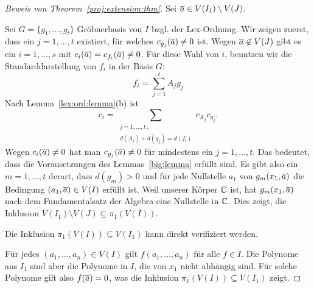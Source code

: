 \documentclass[11pt]{article}
\numberwithin{equation}{section}
\begin{document}
\begin{proof}[Beweis von Theorem~\ref{proj:extension:thm}]	
	Sei $\overline{a} \in V(I_1) \setminus V(J)$. 
	
	Sei $G = \{g_1,\ldots, g_t\}$ Gröbnerbasis von $I$ bzgl. der Lex-Ordnung. Wir zeigen zuerst, dass ein $j =1,\ldots,t$ existiert, für welches $c_{g_j}(\overline{a}) \ne 0$ ist. Wegen $\overline{a} \not\in V(J)$ gibt es ein $i =1,\ldots,s$ mit $c_i (\overline{a}) = c_{f_i}(\overline{a}) \ne 0$. Für diese Wahl von $i$, benutzen wir die Standarddarstellung von $f_i$ in der Basis $G$: 
	\[
		f_i = \sum_{j=1}^t A_j g_j
	\]
	Nach Lemma~\ref{lex:ord:lemma}(b) ist 
	\[
		c_i = \sum_{\substack{j=1,\ldots, t \, :  \\ d(A_j)+ d(g_j) = d(f_i)}} c_{A_j} c_{g_j}. 
	\]
	Wegen $c_i(\overline{a}) \ne 0$ hat man $c_{g_j}(\overline{a}) \ne 0$ für mindestens ein $j=1,\ldots,t$. Das bedeutet, dass die Vorausetzungen des Lemmas~\ref{big:lemma} erfüllt sind. Es gibt also ein $m =1,\ldots,t$ derart, dass $d(g_m)>0$ und für jede Nullstelle $a_1$ von $g_m(x_1,\overline{a})$ die Bedingung $(a_1,\overline{a}) \in V(I)$ erfüllt ist. Weil unserer Körper $\mathbb{C}$ ist, hat $g_m(x_1,\overline{a})$ nach dem Fundamentalsatz der Algebra eine Nullstelle in $\mathbb{C}$. Dies zeigt, die Inklusion $V(I_1) \setminus V(J) \subseteq \pi_1(V(I))$. 
	
	Die Inklusion $\pi_1(V(I)) \subseteq V(I_1)$ kann direkt verifiziert werden. 
	
	Für jedes $(a_1,\ldots,a_n) \in V(I)$ gilt $f(a_1,\dots,a_n)$ für alle $f \in I$. Die Polynome aus $I_1$ sind aber die Polynome in $I$, die von $x_1$ nicht abhängig sind. Für solche Polynome gilt also $f(\overline{a}) = 0$, was die Inklusion $\pi_1(V(I)) \subseteq V(I_1)$ zeigt. 
\end{proof}
\end{document}
